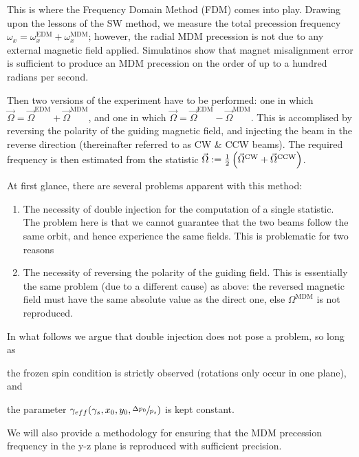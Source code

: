 \documentclass{article}
\newcommand{\W}{\Omega}
\newcommand{\w}{\omega}
\newcommand{\MDM}{^\mathrm{MDM}}
\newcommand{\EDM}{^\mathrm{EDM}}
\newcommand{\CW}{^\mathrm{CW}}
\newcommand{\CCW}{^\mathrm{CCW}}
\begin{document}
This is where the Frequency Domain Method (FDM) comes into play. Drawing upon the lessons of the SW method, we measure the total precession frequency $\w_x = \w_x\EDM + \w_x\MDM$; however, the radial MDM precession is not due to any external magnetic field applied. Simulatinos show that magnet misalignment error is sufficient to produce an MDM precession on the order of up to a hundred radians per second. 


Then two versions of the experiment have to be performed: one in which $\vec\W = \vec\W\EDM + \vec\W\MDM$, and one in which $\vec\W = \vec\W\EDM - \vec\W\MDM$. This is accomplised by reversing the polarity of the guiding magnetic field, and injecting the beam in the reverse direction (thereinafter referred to as CW \& CCW beams). The required frequency is then estimated from the statistic $\vec\W := \frac12\bkt{\vec\W\CW + \vec\W\CCW}$.

At first glance, there are several problems apparent with this method:
\begin{enumerate}
\item The necessity of double injection for the computation of a single statistic. The problem here is that we cannot guarantee that the two beams follow the same orbit, and hence experience the same fields. This is problematic for two reasons \label{itm:Injection}
  
  \item The necessity of reversing the polarity of the guiding field. This is essentially the same problem (due to a different cause) as above: the reversed magnetic field must have the same absolute value as the direct one, else $\W\MDM$ is not reproduced. \label{itm:Polarity}
\end{enumerate}

In what follows we argue that double injection does not pose a problem, so long as 
\begin{inparaenum}[a)]
\item the frozen spin condition is strictly observed (rotations only occur in one plane), and
\item the parameter $\gamma_{eff}(\gamma_s, x_0, y_0, \sfrac{\Delta p_0}{p_s})$ is kept constant.
\end{inparaenum}
We will also provide a methodology for ensuring that the MDM precession frequency in the y-z plane is reproduced with sufficient precision.
\end{document}
